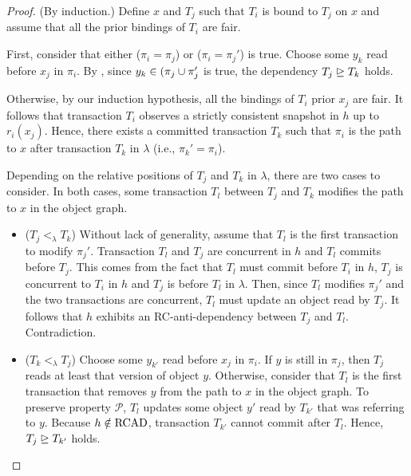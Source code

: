 \begin{proof}

  (By induction.)
  Define $x$ and $T_j$ such that $T_i$ is bound to $T_j$ on $x$ and assume that all the prior bindings of $T_i$ are fair.

  First, consider that either ($\pi_i = \pi_j$) or ($\pi_i = \pi_j'$) is true.
  Choose some $y_k$ read before $x_j$ in $\pi_i$.
  By , since $y_k \in (\pi_j \cup \pi_j'$ is true, the dependency $T_j \mathrel{\unrhd} T_k$ holds.
  
  Otherwise, by our induction hypothesis, all the bindings of $T_i$ prior $x_j$ are fair.
  It follows that transaction $T_i$ observes a strictly consistent snapshot in $h$ up to $r_i(x_j)$.
  Hence, there exists a committed transaction $T_k$ such that $\pi_i$ is the path to $x$ after transaction $T_k$ in $\lambda$ (i.e., $\pi_k'= \pi_i$).

  Depending on the relative positions of $T_j$ and $T_k$ in $\lambda$, there are two cases to consider.
  In both cases, some transaction $T_l$ between $T_j$ and $T_k$ modifies the path to $x$ in the object graph.
  \begin{itemize}
  \item ($T_j <_{\lambda} T_k$)
    Without lack of generality, assume that $T_l$ is the first transaction to modify $\pi_j'$.
    Transaction $T_l$ and $T_j$ are concurrent in $h$ and $T_l$ commits before $T_j$.
    This comes from the fact that $T_l$ must commit before $T_i$ in $h$, $T_j$ is concurrent to $T_i$ in $h$ and $T_j$ is before $T_l$ in $\lambda$.
    Then, since $T_l$ modifies $\pi_j'$ and the two transactions are concurrent, $T_l$ must update an object read by $T_j$.
    It follows that $h$ exhibits an RC-anti-dependency between $T_j$ and $T_l$.
    Contradiction.    
  \item ($T_k <_{\lambda} T_j$)
    Choose some $y_{k'}$ read before $x_j$ in $\pi_i$.
    If $y$ is still in $\pi_j$, then $T_j$ reads at least that version of object $y$.
    Otherwise, consider that $T_l$ is the first transaction that removes $y$ from the path to $x$ in the object graph.
    To preserve property $\mathcal{P}$, $T_l$ updates some object $y'$ read by $T_{k'}$ that was referring to $y$.
    Because $h \notin \RCAD$, transaction $T_{k'}$ cannot commit after $T_l$.
    Hence, $T_j \mathrel{\unrhd} T_{k'}$ holds.
  \end{itemize}
\end{proof}
